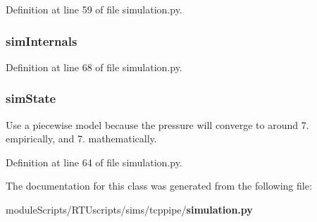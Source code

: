 Definition at line 59 of file simulation.\+py.

\subsubsection[{sim\+Internals}]{\setlength{\rightskip}{0pt plus 5cm}sim\+Internals}\label{classsims_1_1tcppipe_1_1simulation_1_1_simulation_ad9a1d9ec91b2b1f3b2890030194810db}


Definition at line 68 of file simulation.\+py.

\subsubsection[{sim\+State}]{\setlength{\rightskip}{0pt plus 5cm}sim\+State}\label{classsims_1_1tcppipe_1_1simulation_1_1_simulation_a41f89dc1173ec57bbed0975711b48c36}


Use a piecewise model because the pressure will converge to around 7. empirically, and 7. mathematically. 



Definition at line 64 of file simulation.\+py.



The documentation for this class was generated from the following file\+:\begin{DoxyCompactItemize}
\item 
module\+Scripts/\+R\+T\+Uscripts/sims/tcppipe/{\bf simulation.\+py}\end{DoxyCompactItemize}
